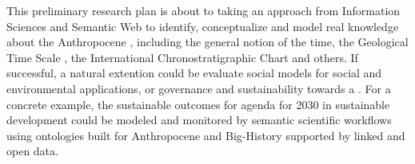 \documentclass[
	12pt, %
	a4paper, %
	oneside, %
	headinclude, footinclude, %
	BCOR5mm, %
]{scrartcl}
\begin{document}
	This preliminary research plan is about to taking an approach from Information Sciences and Semantic Web \citep{tim_berners-lee_james_hendler_and_ora_lassila_semantic_2001} to identify, conceptualize and model real knowledge about the Anthropocene \citep{crutzen_anthropocene_2000}, including the general notion of the time, the Geological Time Scale \citep{gradstein_geologic_2004}, the International Chronostratigraphic Chart \citep{cohen_ics_2013} and others. If successful, a natural extention could be evaluate social models \citep{pitt_interleaving_2011} for social and environmental applications, or governance and sustainability \citep{patterson_exploring_2016} towards a \citep{buckingham_shum_towards_2012}. For a concrete example, the \citep{icsu-issc_review_2015} sustainable outcomes for \citep{united_nations_transforming_2015} agenda for 2030 in sustainable development could be modeled and monitored by semantic scientific workflows using ontologies built for Anthropocene and Big-History supported by linked and open data.





\end{document}

